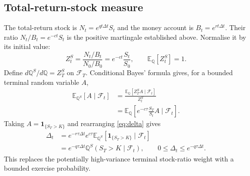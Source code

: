 \documentclass[11pt,a4paper]{article}
\newcommand{\E}{\mathbb E}
\newcommand{\Q}{\mathbb Q}
\newcommand{\F}{\mathcal F}
\newcommand{\ind}{\mathbf 1}
\newcommand{\dt}{\Delta t}
\theoremstyle{remark}
\begin{document}
\subsection{Total-return-stock measure}
The total-return stock is $N_t=e^{qt\dt}S_t$ and the money account is $B_t=e^{rt\dt}$. Their ratio $N_t/B_t=e^{-ct}S_t$ is the positive martingale established above. Normalise it by its initial value:
\begin{equation}
 Z_t^S=\frac{N_t/B_t}{N_0/B_0}
      =e^{-ct}\frac{S_t}{S_0},\qquad
 \E_{\Q}[Z_t^S]=1.
\end{equation}
Define $d\Q^S/d\Q=Z_T^S$ on $\F_T$. Conditional Bayes' formula gives, for a bounded terminal random variable $A$,
\begin{align}
 \E_{\Q^S}[A\mid\F_t]
 &=\frac{\E_{\Q}[Z_T^SA\mid\F_t]}{Z_t^S}\nonumber\\
 &=\E_{\Q}\!\left[
     e^{-c\tau}\frac{S_T}{S_t}A\mid\F_t\right].
 \label{eq:stockmeasure}
\end{align}
Taking $A=\ind_{\{S_T>K\}}$ and rearranging \eqref{eq:delta} gives
\begin{align}
 \Delta_t
 &=e^{-r\tau\dt}e^{c\tau}\E_{\Q^S}[\ind_{\{S_T>K\}}\mid\F_t]\nonumber\\
 &=e^{-q\tau\dt}\Q^S(S_T>K\mid\F_t),\qquad
 0\leq\Delta_t\leq e^{-q\tau\dt}.
 \label{eq:probdelta}
\end{align}
This replaces the potentially high-variance terminal stock-ratio weight with a bounded exercise probability.
\end{document}
